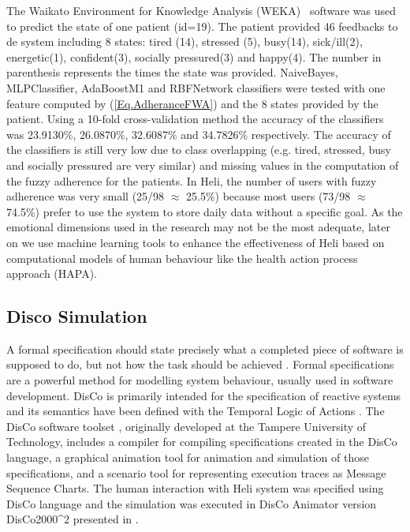\documentclass[graybox]{svmult}
\begin{document}
The Waikato Environment for Knowledge Analysis (WEKA)~\cite{WEKA} software was used to predict the state of one patient (id=19). The patient provided 46 feedbacks to de system including 8 states: tired (14), stressed (5), busy(14), sick/ill(2), energetic(1), confident(3), socially pressured(3) and happy(4). The number in parenthesis represents the times the state was provided. NaiveBayes, MLPClassifier, AdaBoostM1 and RBFNetwork classifiers were tested with one feature computed by (\ref{Eq.AdheranceFWA}) and the 8 states provided by the patient. Using a 10-fold cross-validation method the accuracy of the classifiers was 23.9130\%,  26.0870\%, 32.6087\% and 34.7826\% respectively. The accuracy of the classifiers is still very low due to class overlapping (e.g. tired, stressed, busy and socially pressured are very similar) and missing values in the computation of the fuzzy adherence for the patients. In Heli, the number of users with fuzzy adherence was very small (25/98 $\approx$ 25.5\%) because most users (73/98 $\approx$ 74.5\%) prefer to use the system to store daily data without a specific goal. As the emotional dimensions used in the research may not be the most adequate, later on we use machine learning tools to enhance the effectiveness of Heli based on computational models of human behaviour like the health action process approach (HAPA)\cite{MacPhail}.

\subsection {Disco Simulation}

A formal specification should state precisely what a completed piece of software is supposed to do, but not how the task should be achieved \cite{Diller}. Formal specifications are a powerful method for modelling system behaviour, usually used in software development. DisCo is primarily intended for the specification of reactive systems and its semantics have been defined with the Temporal Logic of Actions \cite{Lamport}. The DisCo software toolset \cite{Aaltonen}, originally developed at the Tampere University of Technology, includes a compiler for compiling specifications created in the DisCo language, a graphical animation tool for animation and simulation of those specifications, and a scenario tool for representing execution traces as Message Sequence Charts. The human interaction with Heli system was specified using DisCo language and the simulation was executed in DisCo Animator version DisCo2000\^{}2  presented in \cite{Nummenmaa}.  
\end{document}
